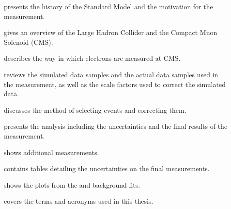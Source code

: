 \begin{description}

    \item[] presents the history of the Standard
        Model and the motivation for the measurement.

    \item[] gives an overview of the Large
        Hadron Collider and the Compact Muon Solenoid (CMS).

    \item[] describes the way in which
        electrons are measured at CMS.

    \item[] reviews the simulated data
        samples and the actual data samples used in the measurement, as well as
        the scale factors used to correct the simulated data.

    \item[] discusses the method of
        selecting events and correcting them.

    \item[] presents the analysis including the
        uncertainties and the final results of the measurement.

    \item[] shows additional
        measurements.

    \item[] contains tables detailing the
        uncertainties on the final measurements.

    \item[] shows the plots from the \QCDjets
        and \wjets background fits.

    \item[] covers the terms and acronyms used in
        this thesis.

\end{description}
